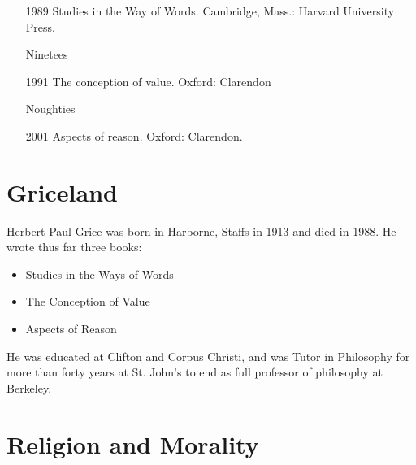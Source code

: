 \documentclass[10pt,titlepage]{book}
\begin{document}
\begin{itemize}
\item[1989] Studies in the Way of Words. Cambridge, Mass.: Harvard University
Press.

\item[Ninetees]

\item[1991] The conception of value. Oxford: Clarendon

\item[Noughties]

\item[2001] Aspects of reason. Oxford: Clarendon.

\end{itemize}

\section{Griceland}

Herbert Paul Grice was born in Harborne, Staffs 
in 1913 and died in 1988.
He wrote thus far three books:
\begin{itemize}
\item Studies in the Ways of Words \cite{grice89}
\item The Conception of Value \cite{grice91}
\item Aspects of Reason \cite{grice01}
\end{itemize}
He was educated at Clifton and Corpus Christi, 
and was Tutor in Philosophy for more than forty years at St. John's to end as full professor of philosophy at Berkeley.

\section{Religion and Morality}
\end{document}
